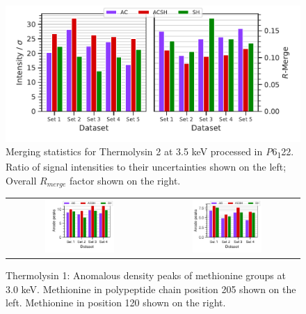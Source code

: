 \begin{figure}
    \centering
    \includegraphics{plots/exp1/tlys_2_P6122/3p5_stats_grid.pdf}
    \caption{Merging statistics for Thermolysin 2 at 3.5 \unit{keV} processed in \textit{P}6\textsubscript{1}22. Ratio of signal intensities to their uncertainties shown on the left; Overall $R_{merge}$ factor shown on the right.}
    \label{fig:tlys_2_3p5}
\end{figure}


\begin{figure}
    \centering
    \begin{tabular}{cc}
        \includegraphics[width = 0.5\textwidth]{plots/exp1/tlys_9_P6122/peaks/3p0_met250.pdf} & \includegraphics[width = 0.5\textwidth]{plots/exp1/tlys_9_P6122/peaks/3p0_met120.pdf}
    \end{tabular}
    \caption{Thermolysin 1: Anomalous density peaks of methionine groups at 3.0 \unit{keV}. Methionine in polypeptide chain position 205 shown on the left. Methionine in position 120 shown on the right.}
    \label{fig:tlys9_met_peaks_3p0}
\end{figure}

